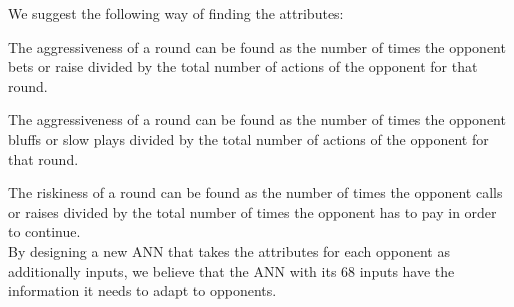 We suggest the following way of finding the attributes:

The aggressiveness of a round can be found as the number of times the opponent bets or raise divided by the total number of actions of the opponent for that round.

The aggressiveness of a round can be found as the number of times the opponent bluffs or slow plays divided by the total number of actions of the opponent for that round.

The riskiness of a round can be found as the number of times the opponent calls or raises divided by the total number of times the opponent has to pay in order to continue.\\


By designing a new ANN that takes the attributes for each opponent as additionally inputs, we believe that the ANN with its 68 inputs have the information it needs to adapt to opponents.
